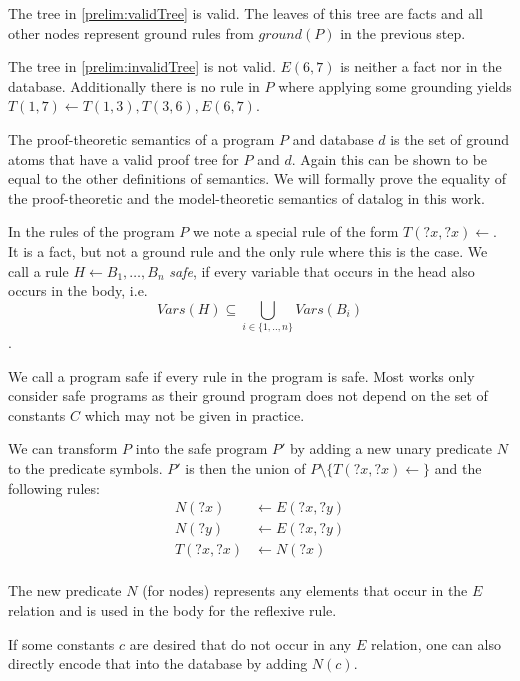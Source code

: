 \begin{contexample}
    The tree in \cref{prelim:validTree} is valid. The leaves of this tree are facts and all other nodes represent ground rules from $ground(P)$ in the previous step.

    The tree in \cref{prelim:invalidTree} is not valid. $E(6,7)$ is neither a fact nor in the database. Additionally there is no rule in $P$ where applying some grounding yields $T(1,7) \leftarrow T(1,3), T(3,6), E(6,7)$.
\end{contexample}

The proof-theoretic semantics of a program $P$ and database $d$ is the set of ground atoms that have a valid proof tree for $P$ and $d$. Again this can be shown to be equal to the other definitions of semantics. We will formally prove the equality of the proof-theoretic and the model-theoretic semantics of datalog in this work.

In the rules of the program $P$ we note a special rule of the form $T(?x, ?x) \leftarrow$. It is a fact, but not a ground rule and the only rule where this is the case. 
We call a rule $H \leftarrow B_1, \dots , B_n$ \textit{safe}, if every variable that occurs in the head also occurs in the body, i.e. \[Vars(H) \subseteq \bigcup_{i \in \{1,..,n\} } Vars(B_i) \].

We call a program safe if every rule in the program is safe. Most works only consider safe programs as their ground program does not depend on the set of constants $C$ which may not be given in practice.

\begin{contexample}
    We can transform $P$ into the safe program $P'$ by adding a new unary predicate $N$ to the predicate symbols. $P'$ is then the union of $P \setminus \{T(?x, ?x) \leftarrow \}$ and the following rules:
    \begin{equation}
        \begin{split}
            N(?x) &\leftarrow E(?x, ?y) \\
            N(?y) &\leftarrow E(?x, ?y) \\
            T(?x,?x) &\leftarrow N(?x) \\
        \end{split}
    \end{equation}

    The new predicate $N$ (for nodes) represents any elements that occur in the $E$ relation and is used in the body for the reflexive rule.

    If some constants $c$ are desired that do not occur in any $E$ relation, one can also directly encode that into the database by adding $N(c)$.
\end{contexample}

